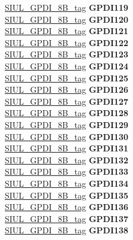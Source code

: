 \begin{DoxyCompactItemize}
\begin{tabbing}
\>\>\mbox{\hyperlink{unionSIUL__GPDI__8B__tag}{SIUL\_GPDI\_8B\_tag}} {\bfseries GPDI119}\\
\>\>\mbox{\hyperlink{unionSIUL__GPDI__8B__tag}{SIUL\_GPDI\_8B\_tag}} {\bfseries GPDI120}\\
\>\>\mbox{\hyperlink{unionSIUL__GPDI__8B__tag}{SIUL\_GPDI\_8B\_tag}} {\bfseries GPDI121}\\
\>\>\mbox{\hyperlink{unionSIUL__GPDI__8B__tag}{SIUL\_GPDI\_8B\_tag}} {\bfseries GPDI122}\\
\>\>\mbox{\hyperlink{unionSIUL__GPDI__8B__tag}{SIUL\_GPDI\_8B\_tag}} {\bfseries GPDI123}\\
\>\>\mbox{\hyperlink{unionSIUL__GPDI__8B__tag}{SIUL\_GPDI\_8B\_tag}} {\bfseries GPDI124}\\
\>\>\mbox{\hyperlink{unionSIUL__GPDI__8B__tag}{SIUL\_GPDI\_8B\_tag}} {\bfseries GPDI125}\\
\>\>\mbox{\hyperlink{unionSIUL__GPDI__8B__tag}{SIUL\_GPDI\_8B\_tag}} {\bfseries GPDI126}\\
\>\>\mbox{\hyperlink{unionSIUL__GPDI__8B__tag}{SIUL\_GPDI\_8B\_tag}} {\bfseries GPDI127}\\
\>\>\mbox{\hyperlink{unionSIUL__GPDI__8B__tag}{SIUL\_GPDI\_8B\_tag}} {\bfseries GPDI128}\\
\>\>\mbox{\hyperlink{unionSIUL__GPDI__8B__tag}{SIUL\_GPDI\_8B\_tag}} {\bfseries GPDI129}\\
\>\>\mbox{\hyperlink{unionSIUL__GPDI__8B__tag}{SIUL\_GPDI\_8B\_tag}} {\bfseries GPDI130}\\
\>\>\mbox{\hyperlink{unionSIUL__GPDI__8B__tag}{SIUL\_GPDI\_8B\_tag}} {\bfseries GPDI131}\\
\>\>\mbox{\hyperlink{unionSIUL__GPDI__8B__tag}{SIUL\_GPDI\_8B\_tag}} {\bfseries GPDI132}\\
\>\>\mbox{\hyperlink{unionSIUL__GPDI__8B__tag}{SIUL\_GPDI\_8B\_tag}} {\bfseries GPDI133}\\
\>\>\mbox{\hyperlink{unionSIUL__GPDI__8B__tag}{SIUL\_GPDI\_8B\_tag}} {\bfseries GPDI134}\\
\>\>\mbox{\hyperlink{unionSIUL__GPDI__8B__tag}{SIUL\_GPDI\_8B\_tag}} {\bfseries GPDI135}\\
\>\>\mbox{\hyperlink{unionSIUL__GPDI__8B__tag}{SIUL\_GPDI\_8B\_tag}} {\bfseries GPDI136}\\
\>\>\mbox{\hyperlink{unionSIUL__GPDI__8B__tag}{SIUL\_GPDI\_8B\_tag}} {\bfseries GPDI137}\\
\>\>\mbox{\hyperlink{unionSIUL__GPDI__8B__tag}{SIUL\_GPDI\_8B\_tag}} {\bfseries GPDI138}\\

\end{tabbing}
\end{DoxyCompactItemize}

